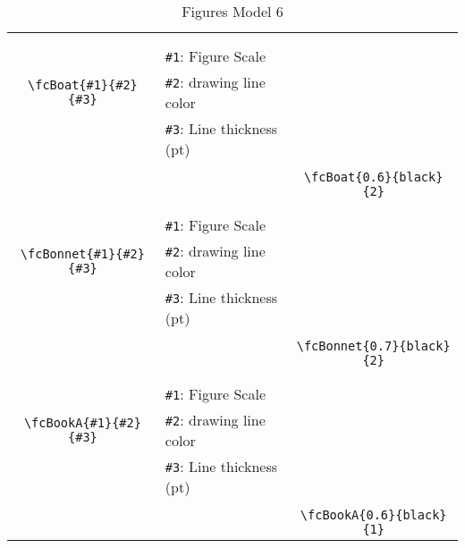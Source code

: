 \documentclass[x11names]{article}
\begin{document}
\begin{table}[H]
\begin{tabular}{|c|l|c|}
	&&\multirow{5}{*}{\fcBoat{0.6}{black}{2}}\\	&&\\	&\verb|#1|: Figure Scale &\\	\verb|\fcBoat{#1}{#2}{#3}|&	\verb|#2|: drawing line color &\\	&\verb|#3|: Line thickness (pt) &\\ &&\\&&	\verb|\fcBoat{0.6}{black}{2}|\\\hline 	
	&&\multirow{5}{*}{\fcBonnet{0.7}{black}{2}}\\	&&\\	&\verb|#1|: Figure Scale &\\	\verb|\fcBonnet{#1}{#2}{#3}|&	\verb|#2|: drawing line color &\\	&\verb|#3|: Line thickness (pt) &\\ &&\\&&	\verb|\fcBonnet{0.7}{black}{2}|\\\hline 	
	&&\multirow{5}{*}{\fcBookA{0.6}{black}{1}}\\	&&\\	&\verb|#1|: Figure Scale &\\	\verb|\fcBookA{#1}{#2}{#3}|&	\verb|#2|: drawing line color &\\	&\verb|#3|: Line thickness (pt) &\\ &&\\&&	\verb|\fcBookA{0.6}{black}{1}|\\\hline 	\hline\end{tabular}\caption{Figures Model 6}\label{tab6}\end{table}
\end{document}
